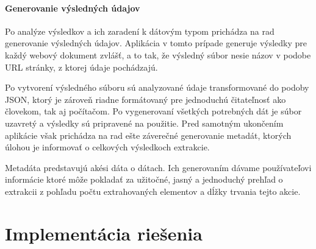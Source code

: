 \subsubsection{Generovanie výsledných údajov}

Po analýze výsledkov a ich zaradení k dátovým typom prichádza na rad generovanie výsledných údajov. Aplikácia v tomto prípade generuje výsledky pre každý webový dokument zvlášť, a to tak, že výsledný súbor nesie názov v podobe URL stránky, z ktorej údaje pochádzajú.

Po vytvorení výsledného súboru sú analyzované údaje transformované do podoby JSON, ktorý je zároveň riadne formátovaný pre jednoduchú čitateľnosť ako človekom, tak aj počítačom. Po vygenerovaní všetkých potrebných dát je súbor uzavretý a výsledky sú pripravené na použitie. Pred samotným ukončením aplikácie však prichádza na rad ešte záverečné generovanie metadát, ktorých úlohou je informovať o celkových výsledkoch extrakcie.

Metadáta predstavujú akési dáta o dátach. Ich generovaním dávame používateľovi informácie ktoré môže pokladať za užitočné, jasný a jednoduchý prehľad o extrakcii z pohľadu počtu extrahovaných elementov a dĺžky trvania tejto akcie.

\chapter{Implementácia riešenia} 
